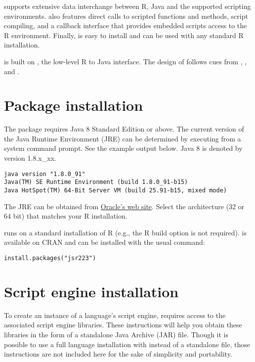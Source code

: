  supports extensive data interchange between R, Java and the supported scripting environments.  also features direct calls to scripted functions and methods, script compiling, and a callback interface that provides embedded scripts access to the R environment. Finally,  is easy to install and can be used with any standard R installation.


 is built on  \citep{rjava}, the low-level R to Java interface. The design of  follows cues from ,  \citep{rscala}, and  \citep{v8pkg}.

\section{Package installation}

The  package requires Java 8 Standard Edition or above. The current version of the Java Runtime Environment (JRE) can be determined by executing  from a system command prompt. See the example output below. Java 8 is denoted by version 1.8.x\_xx.

\begin{verbatim}
java version "1.8.0_91"
Java(TM) SE Runtime Environment (build 1.8.0_91-b15)
Java HotSpot(TM) 64-Bit Server VM (build 25.91-b15, mixed mode)
\end{verbatim}

The JRE can be obtained from  \href{http://www.oracle.com/technetwork/java/javase/downloads/jre8-downloads-2133155.html}{Oracle's web site}. Select the architecture (32 or 64 bit) that matches your R installation.

 runs on a standard installation of R (e.g., the R build option  is not required).  is available on CRAN and can be installed with the usual command:

\begin{verbatim}
install.packages("jsr223")
\end{verbatim}

\hypertarget{scriptengineinstallation}{\section{Script engine installation}}

To create an instance of a language's script engine,  requires access to the associated script engine libraries. These instructions will help you obtain these libraries in the form of a standalone Java Archive (JAR) file. Though it is possible to use a full language installation with  instead of a standalone file, those instructions are not included here for the sake of simplicity and portability.

